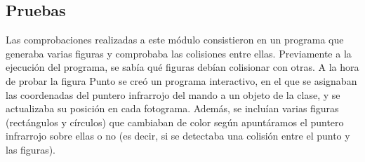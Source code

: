 \subsection{Pruebas}

Las comprobaciones realizadas a este módulo consistieron en un programa que generaba varias figuras y comprobaba las colisiones entre ellas. Previamente a la ejecución del programa, se sabía qué figuras debían colisionar con otras. A la hora de probar la figura Punto se creó un programa interactivo, en el que se asignaban las coordenadas del puntero infrarrojo del mando a un objeto de la clase, y se actualizaba su posición en cada fotograma. Además, se incluían varias figuras (rectángulos y círculos) que cambiaban de color según apuntáramos el puntero infrarrojo sobre ellas o no (es decir, si se detectaba una colisión entre el punto y las figuras).

